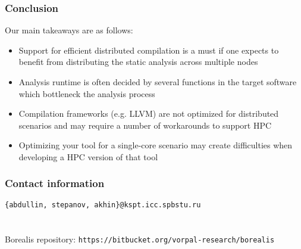 \begin{frame}
\frametitle{Conclusion}
Our main takeaways are as follows:
	\begin{itemize}
		\item Support for efficient distributed compilation is a must if one expects to benefit from distributing the static analysis across multiple nodes
		\item Analysis runtime is often decided by several functions in the target software which bottleneck the analysis process
		\item Compilation frameworks (e.g. LLVM) are not optimized for distributed scenarios and may require a number of workarounds to support HPC
		\item Optimizing your tool for a single-core scenario may create difficulties when developing a HPC version of that tool 
	\end{itemize}
\end{frame}


\begin{frame}
\frametitle{Contact information}
\texttt{\{abdullin, stepanov, akhin\}@kspt.icc.spbstu.ru} \\ \ \\ \ \\
Borealis repository: \texttt{https://bitbucket.org/vorpal-research/borealis}
\end{frame}

